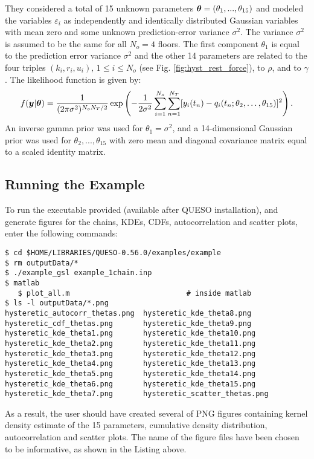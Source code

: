 They considered a total of 15 unknown parameters $\mbox{\boldmath$ \theta $} = (\theta_1 , . . . , \theta_{15})$ and modeled the variables $\varepsilon_i$ as independently and identically distributed Gaussian variables with mean zero and some unknown prediction-error variance $\sigma^2$. The variance $\sigma^2$ is assumed to be the same for all $N_o = 4$ floors.  The first component $\theta_1$ is equal to the prediction error variance $\sigma^2$ and the other 14 parameters are related to the four triples $(k_i, r_i, u_i),\, 1 \leq i \leq N_o$ (see Fig. \ref{fig:hyst_rest_force}), to $\rho$, and to $\gamma$. The likelihood function is given by:
\begin{equation}\label{eq:hyst:like}
 f(\mbox{\boldmath$ y $}|\mbox{\boldmath$ \theta $}) = \dfrac{1}{(2 \pi \sigma^2)^{N_oN_T/2}}\exp \left( -\dfrac{1}{2\sigma^2} \displaystyle \sum_{i=1}^{N_o} \sum_{n=1}^{N_T} [y_i(t_n) - {q}_i(t_n; \theta_2,\ldots,\theta_{15})]^2 \right).
\end{equation}
An inverse gamma  prior was used for $\theta_1=\sigma^2$, and a 14-dimensional Gaussian prior was used for $\theta_2 , ..., \theta_{15}$ with zero mean and diagonal covariance matrix equal to a scaled identity matrix.


\subsection{Running the Example}\label{sec:hysteretic-run}

To run the executable provided (available after QUESO installation), and generate figures for the chains, KDEs, CDFs, autocorrelation and scatter plots, enter the following commands:
\begin{lstlisting}[label={},caption={}]
$ cd $HOME/LIBRARIES/QUESO-0.56.0/examples/example
$ rm outputData/*
$ ./example_gsl example_1chain.inp
$ matlab
   $ plot_all.m	                          # inside matlab
$ ls -l outputData/*.png
hysteretic_autocorr_thetas.png  hysteretic_kde_theta8.png
hysteretic_cdf_thetas.png       hysteretic_kde_theta9.png
hysteretic_kde_theta1.png       hysteretic_kde_theta10.png
hysteretic_kde_theta2.png       hysteretic_kde_theta11.png
hysteretic_kde_theta3.png       hysteretic_kde_theta12.png
hysteretic_kde_theta4.png       hysteretic_kde_theta13.png
hysteretic_kde_theta5.png       hysteretic_kde_theta14.png
hysteretic_kde_theta6.png       hysteretic_kde_theta15.png
hysteretic_kde_theta7.png       hysteretic_scatter_thetas.png
\end{lstlisting}


As a result, the user should have created several of PNG figures containing kernel density estimate of the 15 parameters, cumulative density distribution, autocorrelation and scatter plots. The name of the figure files have been chosen to be informative, as shown in the Listing above.

